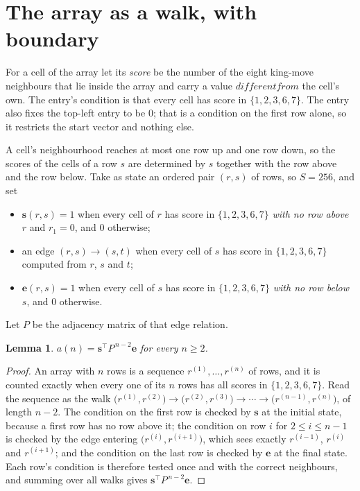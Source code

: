 \documentclass[11pt,a4paper]{article}
\theoremstyle{plain}
\newtheorem{lemma}[theorem]{Lemma}
\theoremstyle{definition}
\begin{document}
\section{The array as a walk, with boundary}

For a cell of the array let its \emph{score} be the number of the eight king-move neighbours that lie inside
the array and carry a value $different from$ the cell's own. The entry's condition is that every cell
has score in $\{1,2,3,6,7\}$. The entry also fixes the top-left entry to be $0$; that is a condition on the first row alone, so it restricts the start vector and nothing else.

A cell's neighbourhood reaches at most one row up and one row down, so the scores of the
cells of a row $s$ are determined by $s$ together with the row above and the row below.
Take as state an ordered pair $(r,s)$ of rows, so $S=256$, and set
\begin{itemize}
\item $\mathbf{s}(r,s)=1$ when every cell of $r$ has score in $\{1,2,3,6,7\}$ \emph{with no row
above $r$} and $r_1=0$, and $0$ otherwise;
\item an edge $(r,s)\to(s,t)$ when every cell of $s$ has score in $\{1,2,3,6,7\}$ computed from
$r$, $s$ and $t$;
\item $\mathbf{e}(r,s)=1$ when every cell of $s$ has score in $\{1,2,3,6,7\}$ \emph{with no row
below $s$}, and $0$ otherwise.
\end{itemize}
Let $P$ be the adjacency matrix of that edge relation.

\begin{lemma}\label{lem:walk}
$a(n)=\mathbf{s}^{\!\top}P^{\,n-2}\mathbf{e}$ for every $n\ge2$.
\end{lemma}

\begin{proof}
An array with $n$ rows is a sequence $r^{(1)},\dots,r^{(n)}$ of rows, and it is counted
exactly when every one of its $n$ rows has all scores in $\{1,2,3,6,7\}$. Read the sequence as the
walk $\bigl(r^{(1)},r^{(2)}\bigr)\to\bigl(r^{(2)},r^{(3)}\bigr)\to\cdots\to
\bigl(r^{(n-1)},r^{(n)}\bigr)$, of length $n-2$. The condition on the first row is
checked by $\mathbf{s}$ at the initial state, because a first row has no row above it; the
condition on row $i$ for $2\le i\le n-1$ is checked by the edge entering
$\bigl(r^{(i)},r^{(i+1)}\bigr)$, which sees exactly $r^{(i-1)}$, $r^{(i)}$ and
$r^{(i+1)}$; and the condition on the last row is checked by $\mathbf{e}$ at the final
state. Each row's condition is therefore tested once and with the correct neighbours, and
summing over all walks gives $\mathbf{s}^{\!\top}P^{\,n-2}\mathbf{e}$.
\end{proof}
\end{document}
